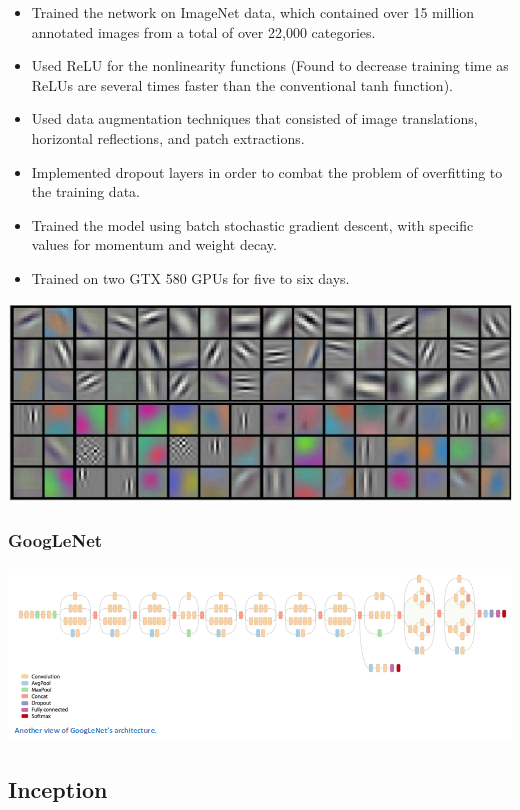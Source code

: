 \documentclass[11pt]{article}
\makeatletter
\def\maxwidth{\ifdim\Gin@nat@width>\linewidth\linewidth
    \else\Gin@nat@width\fi}
\let\Oldincludegraphics\includegraphics
\renewcommand{\includegraphics}[1]{\Oldincludegraphics[width=.8\maxwidth]{#1}}
\providecommand{\tightlist}{%
      \setlength{\itemsep}{0pt}\setlength{\parskip}{0pt}}
\makeatother
\begin{document}
    \begin{itemize}
\tightlist
\item
  Trained the network on ImageNet data, which contained over 15 million
  annotated images from a total of over 22,000 categories.
\item
  Used ReLU for the nonlinearity functions (Found to decrease training
  time as ReLUs are several times faster than the conventional tanh
  function).
\item
  Used data augmentation techniques that consisted of image
  translations, horizontal reflections, and patch extractions.
\item
  Implemented dropout layers in order to combat the problem of
  overfitting to the training data.
\item
  Trained the model using batch stochastic gradient descent, with
  specific values for momentum and weight decay.
\item
  Trained on two GTX 580 GPUs for five to six days.
\end{itemize}

    \includegraphics{./weights.jpeg}

    \hypertarget{googlenet}{%
\subsubsection{GoogLeNet}\label{googlenet}}

\includegraphics{./GoogLeNet.png}

    \hypertarget{inception}{%
\subsection{Inception}\label{inception}}
\end{document}
